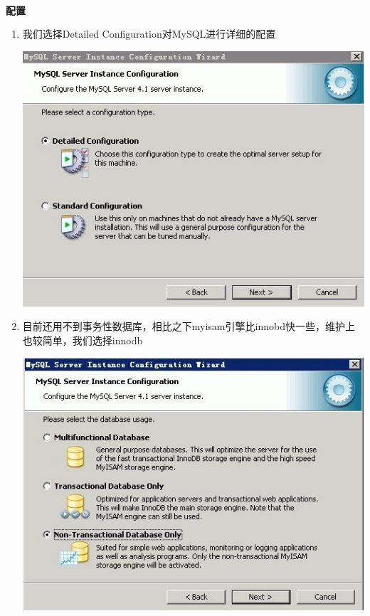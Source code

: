 \documentclass{article}
\begin{document}
\paragraph{}\textbf{配置}\\

\begin{enumerate}
\item 我们选择Detailed Configuration对MySQL进行详细的配置

\includegraphics{img/install/windows/mysql/10.jpg}

\item 目前还用不到事务性数据库，相比之下myisam引擎比innobd快一些，维护上也较简单，我们选择innodb

\includegraphics{img/install/windows/mysql/11.jpg}


\end{enumerate}
\end{document}

